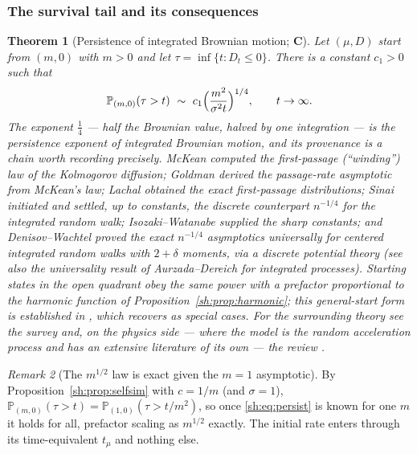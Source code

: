 \documentclass[11pt]{article}
\numberwithin{equation}{section}
\theoremstyle{plain}
\newtheorem{theorem}{Theorem}[section]
\theoremstyle{definition}
\theoremstyle{remark}
\newtheorem{remark}[theorem]{Remark}
\newcommand{\PP}{\mathbb{P}}
\begin{document}
\subsubsection{The survival tail and its consequences}\label{sh:subsub:tail}

\begin{theorem}[Persistence of integrated Brownian motion; \textbf{C}]
\label{sh:thm:persist}
Let $(\mu,D)$ start from $(m,0)$ with $m>0$ and let
$\tau=\inf\{t:D_t\le0\}$. There is a constant $c_1>0$ such that
\begin{equation}\label{sh:eq:persist}
\PP_{(m,0)}(\tau>t)\ \sim\ c_1\Bigl(\frac{m^2}{\sigma^2t}\Bigr)^{1/4},
\qquad t\to\infty .
\end{equation}
The exponent $\tfrac14$ --- half the Brownian value, halved by one
integration --- is the persistence exponent of integrated Brownian
motion, and its provenance is a chain worth recording precisely. McKean
\cite{McK63} computed the first-passage (``winding'') law of the
Kolmogorov diffusion; Goldman \cite{Gol71} derived the passage-rate
asymptotic from McKean's law; Lachal \cite{Lac91} obtained the exact
first-passage distributions; Sinai \cite{Sin92} initiated and settled,
up to constants, the discrete counterpart $n^{-1/4}$ for the integrated
random walk; Isozaki--Watanabe \cite{IW94} supplied the sharp constants;
and Denisov--Wachtel \cite{DW15} proved the exact $n^{-1/4}$ asymptotics
universally for centered integrated random walks with $2+\delta$
moments, via a discrete potential theory (see also the universality
result of Aurzada--Dereich \cite{AD13} for integrated processes).
Starting states in the open quadrant obey the same power with a
prefactor proportional to the harmonic function of
Proposition~\ref{sh:prop:harmonic}; this general-start form is
established in \cite{GJW99}, which recovers \cite{Gol71,IW94} as
special cases. For the surrounding theory see the survey \cite{AS15}
and, on the physics side --- where the model is the \emph{random
acceleration process} and has an extensive literature of its own ---
the review \cite{BMS13}.
\end{theorem}

\begin{remark}[The $m^{1/2}$ law is exact given the $m=1$ asymptotic]
By Proposition~\ref{sh:prop:selfsim} with $c=1/m$ (and $\sigma=1$),
$\PP_{(m,0)}(\tau>t)=\PP_{(1,0)}(\tau>t/m^2)$, so once
\eqref{sh:eq:persist} is known for one $m$ it holds for all, prefactor
scaling as $m^{1/2}$ exactly. The initial rate enters through its
time-equivalent $t_\mu$ and nothing else.
\end{remark}
\end{document}
